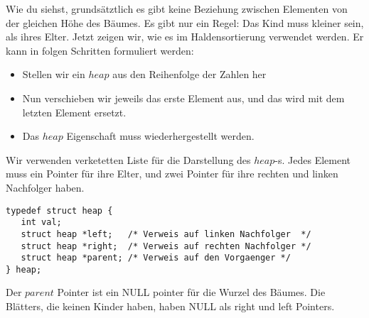 Wie du siehst, grundsätztlich es gibt keine Beziehung zwischen Elementen von der 
gleichen Höhe des Bäumes. Es gibt nur ein Regel: Das Kind muss kleiner sein, als ihres
Elter. Jetzt zeigen wir, wie es im Haldensortierung verwendet werden.
Er kann in folgen Schritten formuliert werden:
\begin{itemize}
\item Stellen wir ein $heap$ aus den Reihenfolge der Zahlen her
\item Nun verschieben wir jeweils das erste Element aus, und das wird mit dem letzten Element 
ersetzt.
\item Das $heap$ Eigenschaft muss wiederhergestellt werden.
\end{itemize}

Wir verwenden verketetten Liste für die Darstellung des $heap$-s. Jedes Element muss
ein Pointer für ihre Elter, und zwei Pointer für ihre rechten und linken Nachfolger haben.
\begin{lstlisting}
typedef struct heap {
   int val;
   struct heap *left;   /* Verweis auf linken Nachfolger  */
   struct heap *right;  /* Verweis auf rechten Nachfolger */
   struct heap *parent; /* Verweis auf den Vorgaenger */
} heap;
\end{lstlisting}
Der $parent$ Pointer ist ein NULL pointer für die Wurzel des Bäumes. Die Blätters, die keinen
Kinder haben, haben NULL als right und left Pointers.


